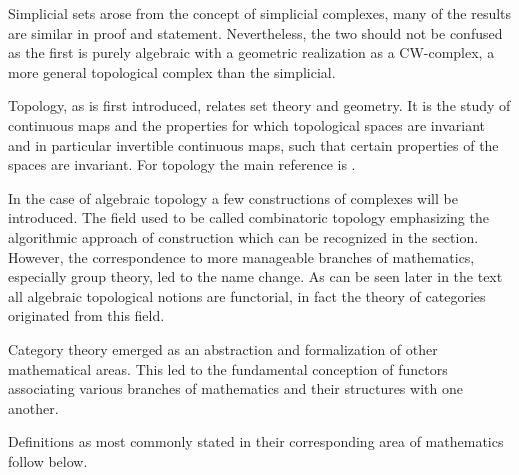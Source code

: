 \documentclass[../../main.tex]{subfiles}
\begin{document}
    Simplicial sets arose from the concept of simplicial complexes, many of the results are similar in proof and statement. Nevertheless, the two should not be confused as the first is purely algebraic with a geometric realization as a CW-complex, a more general topological complex than the simplicial. 
    
    Topology, as is first introduced, relates set theory and geometry. It is the study of continuous maps and the properties for which topological spaces are invariant and in particular invertible continuous maps, such that certain properties of the spaces are invariant. For topology the main reference is \cite{armstrong-basictop}.
    
    In the case of algebraic topology a few constructions of complexes will be introduced. The field used to be called combinatoric topology emphasizing the algorithmic approach of construction which can be recognized in the section. However, the correspondence to more manageable branches of mathematics, especially group theory, led to the name change. As can be seen later in the text all algebraic topological notions are functorial, in fact the theory of categories originated from this field. 
    
    Category theory emerged as an abstraction and formalization of other mathematical areas. This led to the fundamental conception of functors associating various branches of mathematics and their structures with one another. 
    
    
    
    Definitions as most commonly stated in their corresponding area of mathematics follow below. 
    
\end{document}
